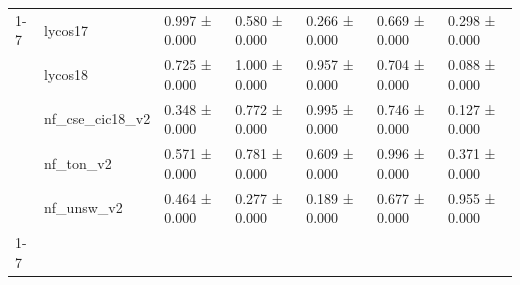\begin{table}
\begin{tabular}{lllllll}
\cline{1-7}
\multirow[t]{5}{*}{xgb} & lycos17 & 0.997 ± 0.000 & 0.580 ± 0.000 & 0.266 ± 0.000 & 0.669 ± 0.000 & 0.298 ± 0.000 \\
 & lycos18 & 0.725 ± 0.000 & 1.000 ± 0.000 & 0.957 ± 0.000 & 0.704 ± 0.000 & 0.088 ± 0.000 \\
 & nf_cse_cic18_v2 & 0.348 ± 0.000 & 0.772 ± 0.000 & 0.995 ± 0.000 & 0.746 ± 0.000 & 0.127 ± 0.000 \\
 & nf_ton_v2 & 0.571 ± 0.000 & 0.781 ± 0.000 & 0.609 ± 0.000 & 0.996 ± 0.000 & 0.371 ± 0.000 \\
 & nf_unsw_v2 & 0.464 ± 0.000 & 0.277 ± 0.000 & 0.189 ± 0.000 & 0.677 ± 0.000 & 0.955 ± 0.000 \\
\cline{1-7}
\bottomrule
\end{tabular}
\end{table}
